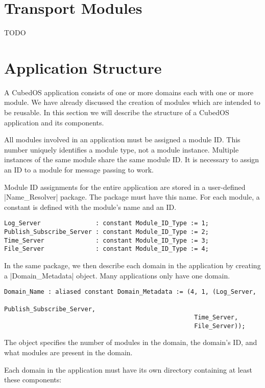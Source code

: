 \section{Transport Modules}

TODO

\section{Application Structure}

A CubedOS application consists of one or more domains each with one or more module. We have already discussed the creation of modules which are intended to be reusable. In this section we will describe the structure of a CubedOS application and its components.

All modules involved in an application must be assigned a module ID. This number uniquely identifies a module type, not a module instance. Multiple instances of the same module share the same module ID. It is necessary to assign an ID to a module for message passing to work.

Module ID assignments for the entire application are stored in a user-defined |Name_Resolver| package. The package must have this name. For each module, a constant is defined with the module's name and an ID.

\begin{verbatim}
Log_Server               : constant Module_ID_Type := 1;
Publish_Subscribe_Server : constant Module_ID_Type := 2;
Time_Server              : constant Module_ID_Type := 3;
File_Server              : constant Module_ID_Type := 4;
\end{verbatim}

In the same package, we then describe each domain in the application by creating a |Domain_Metadata| object. Many applications only have one domain.

\begin{verbatim}
Domain_Name : aliased constant Domain_Metadata := (4, 1, (Log_Server,
                                                    Publish_Subscribe_Server,
                                                    Time_Server,
                                                    File_Server));
\end{verbatim}

The object specifies the number of modules in the domain, the domain's ID, and what modules are present in the domain.

Each domain in the application must have its own directory containing at least these components:


